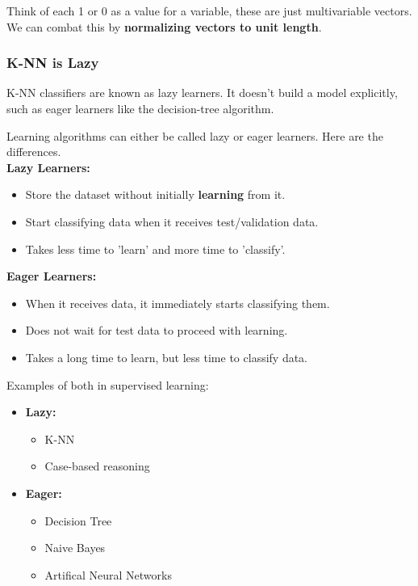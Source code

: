 \documentclass[english, 10pt]{article}
\begin{document}
Think of each 1 or 0 as a value for a variable, these are just multivariable vectors.\\

We can combat this by \textbf{normalizing vectors to unit length}.

\subsubsection{K-NN is Lazy}

K-NN classifiers are known as lazy learners. It doesn't build a model explicitly, such as eager learners like the decision-tree algorithm.

\begin{tcolorbox}[title=Aside: Lazy vs. Eager Learners,colframe=black,colback=white,arc=0pt,fonttitle=\bfseries]

Learning algorithms can either be called lazy or eager learners. Here are the differences.\\

\textbf{Lazy Learners:}
\begin{itemize}
	\item Store the dataset without initially \textbf{learning} from it.
	\item Start classifying data when it receives test/validation data.
	\item Takes less time to 'learn' and more time to 'classify'.
\end{itemize}

\hfill \break \textbf{Eager Learners:}
\begin{itemize}
	\item When it receives data, it immediately starts classifying them.
	\item Does not wait for test data to proceed with learning.
	\item Takes a long time to learn, but less time to classify data.
\end{itemize}

\hfill \break Examples of both in supervised learning:
\begin{itemize}
	\item \textbf{Lazy:}
	\begin{itemize}
		\item K-NN
		\item Case-based reasoning
	\end{itemize}
	\item \textbf{Eager:}
	\begin{itemize}
		\item Decision Tree
		\item Naive Bayes
		\item Artifical Neural Networks
	\end{itemize}
\end{itemize}

\end{tcolorbox}
\end{document}

